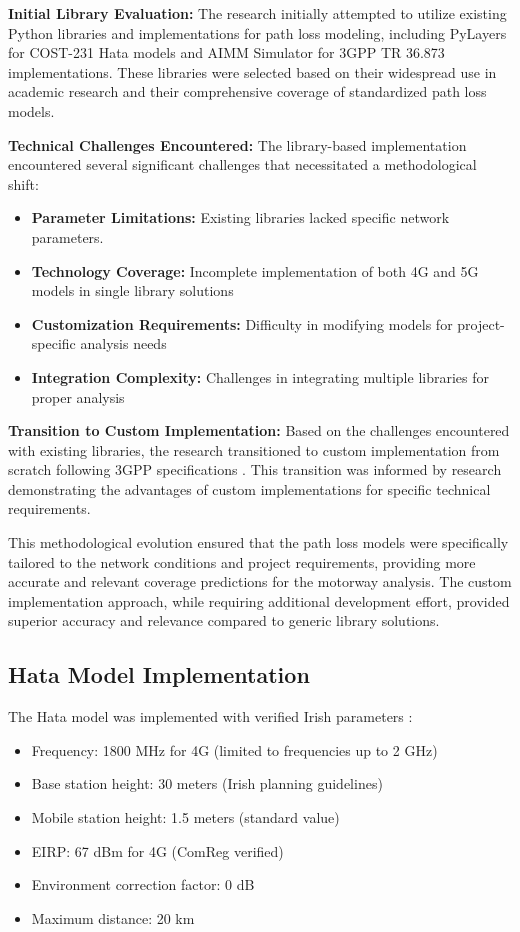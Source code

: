 \documentclass[MScCS]{uccthesis}
\begin{document}
\textbf{Initial Library Evaluation:} The research initially attempted to utilize existing Python libraries and implementations for path loss modeling, including PyLayers \cite{pylayers2024} for COST-231 Hata models and AIMM Simulator \cite{aimm_simulator} for 3GPP TR 36.873 implementations. These libraries were selected based on their widespread use in academic research and their comprehensive coverage of standardized path loss models.

\textbf{Technical Challenges Encountered:} The library-based implementation encountered several significant challenges that necessitated a methodological shift:
\begin{itemize}
\item \textbf{Parameter Limitations:} Existing libraries lacked specific network parameters.
\item \textbf{Technology Coverage:} Incomplete implementation of both 4G and 5G models in single library solutions
\item \textbf{Customization Requirements:} Difficulty in modifying models for project-specific analysis needs
\item \textbf{Integration Complexity:} Challenges in integrating multiple libraries for proper analysis
\end{itemize}

\textbf{Transition to Custom Implementation:} Based on the challenges encountered with existing libraries, the research transitioned to custom implementation from scratch following 3GPP specifications \cite{3gpp_tr36873,3gpp_tr38901}. This transition was informed by research demonstrating the advantages of custom implementations for specific technical requirements.

This methodological evolution ensured that the path loss models were specifically tailored to the network conditions and project requirements, providing more accurate and relevant coverage predictions for the motorway analysis. The custom implementation approach, while requiring additional development effort, provided superior accuracy and relevance compared to generic library solutions.

\subsection{Hata Model Implementation}
   The Hata model was implemented with verified Irish parameters \cite{comreg25_13,itu_p1812_6}:
   
\begin{itemize}
\item Frequency: 1800 MHz for 4G (limited to frequencies up to 2 GHz)
\item Base station height: 30 meters (Irish planning guidelines)
\item Mobile station height: 1.5 meters (standard value)
\item EIRP: 67 dBm for 4G (ComReg verified)
\item Environment correction factor: 0 dB 
\item Maximum distance: 20 km
\end{itemize}
\end{document}
